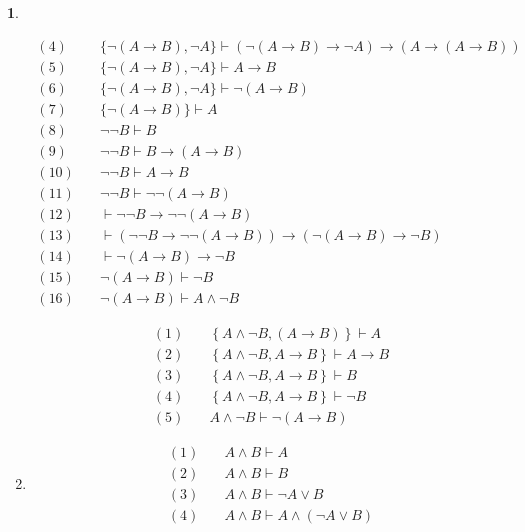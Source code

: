 \documentclass[a4paper, 12pt]{ctexbook} %
\theoremstyle{plain}
\theoremstyle{definition}
\newtheorem{problem}{}
\theoremstyle{remark}
\begin{document}
\begin{problem}
\begin{enumerate}
\begin{align*}
(4) \quad &\{\neg \left(A \to B \right) , \neg  A\} \vdash  \left(\neg  \left(A \to B \right) \to \neg A   \right) \to \left( A \to \left(A \to B \right)\right) \tag{定理 7} \\
(5) \quad &\{\neg \left(A \to B \right) , \neg  A\} \vdash A \to B \tag{$\to -$} \\
(6) \quad &\{\neg \left(A \to B \right) , \neg  A\} \vdash \neg \left(A \to B \right) \tag{$\in$} \\
(7) \quad &\{\neg \left(A \to B \right)\} \vdash  A \tag{(5)(6)$\neg -$} \\
(8) \quad &\neg \neg B \vdash B \tag{$\neg \neg -$}\\
(9) \quad &\neg \neg B \vdash B \to \left(A \to B \right) \tag{定理 7} \\
(10) \quad &\neg \neg B \vdash A \to B \tag{$\to -$} \\
(11) \quad &\neg \neg B \vdash \neg \neg \left(A \to B \right) \tag{$\neg \neg + $} \\
(12) \quad &\vdash \neg \neg B \to \neg \neg \left(A \to B \right) \tag{演绎} \\
(13) \quad &\vdash  \left(\neg \neg B \to \neg \neg \left(A \to B \right) \right) \to \left(\neg \left(A \to B \right) \to \neg B\right) \tag{定理 7}\\ 
(14) \quad &\vdash \neg \left(A \to B \right) \to \neg B \tag{$\to -$}\\ 
(15) \quad &\neg \left(A \to B \right) \vdash \neg B \tag{演绎}\\
(16) \quad &\neg \left(A \to B \right) \vdash A \wedge \neg B \tag{(7)(15)$\wedge + $} 
\end{align*}

\begin{align*}
(1)\quad &\left\{ A \wedge  \neg B , \left(A \to B \right) \right\} \vdash  A \tag{$ \wedge  -$}\\
(2)\quad &\left\{ A \wedge  \neg B , A \to B \right\} \vdash  A \to B \tag{$\in$} \\ 
(3)\quad &\left\{ A \wedge  \neg B , A \to B \right\} \vdash  B \tag{$\to - $} \\ 
(4)\quad &\left\{ A \wedge  \neg B , A \to B \right\} \vdash \neg B \tag{$\wedge -$} \\
(5)\quad &A \wedge  \neg B \vdash  \neg \left(A \to B \right) \tag{$\neg + $}
\end{align*}
\item 
\begin{align*}
(1)\quad &A \wedge B \vdash A \tag{$\wedge -$}\\
(2)\quad &A \wedge B \vdash B \tag{$\wedge - $} \\
(3)\quad &A \wedge B \vdash \neg A \vee B \tag{$\vee + $} \\
(4)\quad &A \wedge  B \vdash  A \wedge \left(\neg A \vee B \right) \tag{$\wedge + , (1) , (3) $}
\end{align*}


\end{enumerate}
\end{problem}
\end{document}
